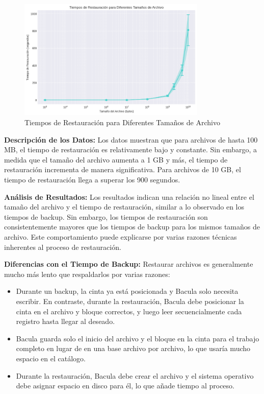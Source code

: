 \begin{figure}[H]
    \centering
    \includegraphics[width=0.8\textwidth]{tiempo_restauracion.png}
    \caption{Tiempos de Restauración para Diferentes Tamaños de Archivo}
    \label{fig:tiempo-restauracion}
\end{figure}

\textbf{Descripción de los Datos:}
Los datos muestran que para archivos de hasta 100 MB, el tiempo de restauración es relativamente bajo y constante. Sin embargo, a medida que el tamaño del archivo aumenta a 1 GB y más, el tiempo de restauración incrementa de manera significativa. Para archivos de 10 GB, el tiempo de restauración llega a superar los 900 segundos.

\textbf{Análisis de Resultados:}
Los resultados indican una relación no lineal entre el tamaño del archivo y el tiempo de restauración, similar a lo observado en los tiempos de backup. Sin embargo, los tiempos de restauración son consistentemente mayores que los tiempos de backup para los mismos tamaños de archivo. Este comportamiento puede explicarse por varias razones técnicas inherentes al proceso de restauración.

\textbf{Diferencias con el Tiempo de Backup:}
Restaurar archivos es generalmente mucho más lento que respaldarlos por varias razones:
\begin{itemize}
    \item Durante un backup, la cinta ya está posicionada y Bacula solo necesita escribir. En contraste, durante la restauración, Bacula debe posicionar la cinta en el archivo y bloque correctos, y luego leer secuencialmente cada registro hasta llegar al deseado.
    \item Bacula guarda solo el inicio del archivo y el bloque en la cinta para el trabajo completo en lugar de en una base archivo por archivo, lo que usaría mucho espacio en el catálogo.
    \item Durante la restauración, Bacula debe crear el archivo y el sistema operativo debe asignar espacio en disco para él, lo que añade tiempo al proceso.
\end{itemize}

